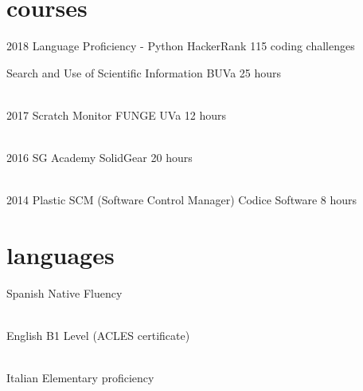 \documentclass{friggeri-cv}
\begin{document}


  \section{courses}

    \begin{entrylist}

      \entry
      {2018}
      {Language Proficiency - Python}
      {HackerRank}
      {115 coding challenges}

      \entry
      {}
      {Search and Use of Scientific Information}
      {BUVa}
      {25 hours}

      \\
      \entry
      {2017}
      {Scratch Monitor}
      {FUNGE UVa}
      {12 hours}

      \\
      \entry
      {2016}
      {SG Academy}
      {SolidGear}
      {20 hours}

      \\
      \entry
      {2014}
      {Plastic SCM (Software Control Manager)}
      {Codice Software}
      {8 hours}

    \end{entrylist}



  \section{languages}

    \begin{entrylist}

      \entry
      {}
      {Spanish}
      {}
      {Native Fluency}

      \\
      \entry
      {}
      {English}
      {}
      {B1 Level (ACLES certificate)}

      \\
      \entry
      {}
      {Italian}
      {}
      {Elementary proficiency}

    \end{entrylist}
\end{document}

